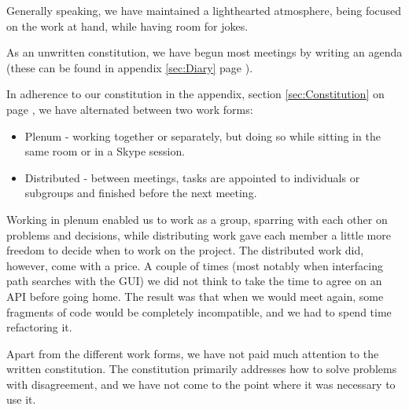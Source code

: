 Generally speaking, we have maintained a lighthearted atmosphere, being focused on the work at hand, while having room for jokes.

As an unwritten constitution, we have begun most meetings by writing an agenda (these can be found in appendix \ref{sec:Diary} page \pageref{sec:Diary}).

In adherence to our constitution in the appendix, section \ref{sec:Constitution} on page \pageref{sec:Constitution},
we have alternated between two work forms: 
\begin{itemize}
	\item Plenum - working together or separately, but doing so while sitting in the same room or in a Skype session.
	\item Distributed - between meetings, tasks are appointed to individuals or subgroups and finished before the next meeting.
\end{itemize}
Working in plenum enabled us to work as a group, sparring with each other on problems and decisions, while distributing work gave each member a little more freedom to decide when to work on the project.
The distributed work did, however, come with a price. A couple of times (most notably when interfacing path searches with the GUI) we did not think to take the time to agree on an API before going home. The result was that when we would meet again, some fragments of code would be completely incompatible, and we had to spend time refactoring it.

Apart from the different work forms, we have not paid much attention to the written constitution. The constitution primarily addresses how to solve problems with disagreement, and we have not come to the point where it was necessary to use it.
